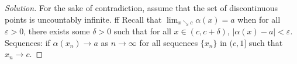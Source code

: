 \documentclass{article}
\newcommand{\ep}{{\varepsilon}}
\begin{document}
\begin{proof}[Solution]\let\qed\relax
	For the sake of contradiction, assume that the set of discontinuous
	points is uncountably infinite.
	ff
	Recall that $\lim_{x\searrow c}\alpha(x) = a$ when
	for all $\ep > 0$, there exists some $\delta > 0$
	such that for all $x \in (c,c+\delta)$, $|\alpha(x) - a| < \ep$.
	Sequences: if $\alpha(x_n) \to a$ as $n \to \infty$
	for all sequences $\{x_n\}$ in $(c,1]$ such that $x_n \to c$.
\end{proof}
\end{document}
